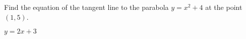 \begin{Exercise}[title={Rate of Change},label=exRateOfChange]
	\Question Find the equation of the tangent line to the parabola $y =x^{2} +4$ at the point $(1 ,5)$. %

\end{Exercise}
\begin{Answer}[ref={exRateOfChange}]
	\Question %
	$y =2 x +3$ 
\end{Answer}%

